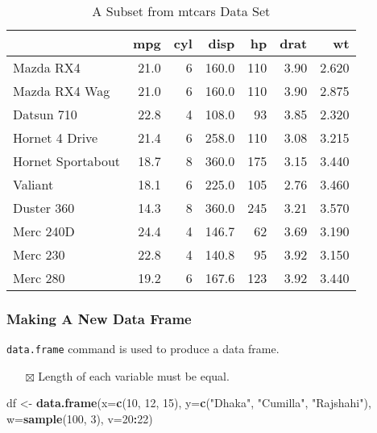 \documentclass[
]{book}
\newenvironment{Shaded}{\begin{snugshade}}{\end{snugshade}}
\newcommand{\DataTypeTok}[1]{\textcolor[rgb]{0.13,0.29,0.53}{#1}}
\newcommand{\DecValTok}[1]{\textcolor[rgb]{0.00,0.00,0.81}{#1}}
\newcommand{\KeywordTok}[1]{\textcolor[rgb]{0.13,0.29,0.53}{\textbf{#1}}}
\newcommand{\NormalTok}[1]{#1}
\newcommand{\OperatorTok}[1]{\textcolor[rgb]{0.81,0.36,0.00}{\textbf{#1}}}
\newcommand{\StringTok}[1]{\textcolor[rgb]{0.31,0.60,0.02}{#1}}
\providecommand{\tightlist}{%
  \setlength{\itemsep}{0pt}\setlength{\parskip}{0pt}}
\begin{document}
\begin{table}

\caption{\label{tab:unnamed-chunk-11}A Subset from mtcars Data Set}
\centering
\begin{tabular}[t]{l|r|r|r|r|r|r}
\hline
  & mpg & cyl & disp & hp & drat & wt\\
\hline
Mazda RX4 & 21.0 & 6 & 160.0 & 110 & 3.90 & 2.620\\
\hline
Mazda RX4 Wag & 21.0 & 6 & 160.0 & 110 & 3.90 & 2.875\\
\hline
Datsun 710 & 22.8 & 4 & 108.0 & 93 & 3.85 & 2.320\\
\hline
Hornet 4 Drive & 21.4 & 6 & 258.0 & 110 & 3.08 & 3.215\\
\hline
Hornet Sportabout & 18.7 & 8 & 360.0 & 175 & 3.15 & 3.440\\
\hline
Valiant & 18.1 & 6 & 225.0 & 105 & 2.76 & 3.460\\
\hline
Duster 360 & 14.3 & 8 & 360.0 & 245 & 3.21 & 3.570\\
\hline
Merc 240D & 24.4 & 4 & 146.7 & 62 & 3.69 & 3.190\\
\hline
Merc 230 & 22.8 & 4 & 140.8 & 95 & 3.92 & 3.150\\
\hline
Merc 280 & 19.2 & 6 & 167.6 & 123 & 3.92 & 3.440\\
\hline
\end{tabular}
\end{table}

\hypertarget{making-a-new-data-frame}{%
\subsubsection{Making A New Data Frame}\label{making-a-new-data-frame}}

\texttt{data.frame} command is used to produce a data frame.

\begin{itemize}
\tightlist
\item[$\boxtimes$]
  Length of each variable must be equal.
\end{itemize}

\begin{Shaded}
\begin{Highlighting}[]
\NormalTok{df <-}\StringTok{ }\KeywordTok{data.frame}\NormalTok{(}\DataTypeTok{x=}\KeywordTok{c}\NormalTok{(}\DecValTok{10}\NormalTok{, }\DecValTok{12}\NormalTok{, }\DecValTok{15}\NormalTok{),}
                 \DataTypeTok{y=}\KeywordTok{c}\NormalTok{(}\StringTok{"Dhaka"}\NormalTok{, }\StringTok{"Cumilla"}\NormalTok{, }\StringTok{"Rajshahi"}\NormalTok{),}
                 \DataTypeTok{w=}\KeywordTok{sample}\NormalTok{(}\DecValTok{100}\NormalTok{, }\DecValTok{3}\NormalTok{),}
                 \DataTypeTok{v=}\DecValTok{20}\OperatorTok{:}\DecValTok{22}\NormalTok{)}
\end{Highlighting}
\end{Shaded}
\end{document}
